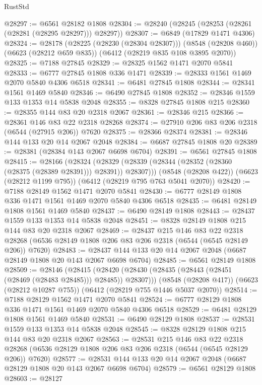 \begin{lexlean}{RustStd}
\begin{coremodule}
@28297 := @6561 @28182 @1808
@28304 := @28240 (@28245 (@28253 (@28261 (@28281 (@28295 @28297))) @28297))
@28307 := @6849 (@17829 @1471 @4306)
@28324 := @28178
    (@28225 (@28230 (@28304 @28307)))
    (@8548 (@28208 @460))
    (@6623 (@28212 @659 @835))
    (@6412 (@28219 @835 @108 @3895 @2070))
@28325 := @7188 @27845
@28329 := @28325 @1562 @1471 @2070 @5841
@28333 := @6777 @27845 @1808 @336 @1471
@28339 := @28333 @1561 @1469 @2070 @5840 @4306 @6518
@28341 := @6481 @27845 @1808
@28344 := @28341 @1561 @1469 @5840
@28346 := @6490 @27845 @1808
@28352 := @28346 @1559 @133 @1353 @14 @5838 @2048
@28355 := @8328 @27845 @1808 @215
@28360 := @28355 @144 @83 @20 @2318 @2067
@28361 := @28346 @215
@28366 := @28361 @146 @83 @22 @2318 @28268
@28374 := @27910 @206 @83 @206 @2318 (@6544 (@27915 @206)) @7620
@28375 := @28366 @28374
@28381 := @28346 @144 @133 @20 @14 @2067 @2048
@28384 := @6687 @27845 @1808 @20
@28389 := @28381 (@28384 @143 @2067 @6698 @6704)
@28391 := @6561 @27845 @1808
@28415 := @28166
    (@28324 (@28329 (@28339 (@28344 (@28352 (@28360 (@28375 (@28389 @28391))) @28391)) @28307)))
    (@8548 (@28208 @422))
    (@6623 (@28212 @1199 @795))
    (@6412 (@28219 @795 @763 @5041 @2070))
@28420 := @7188 @28149 @1562 @1471 @2070 @5841
@28430 := @6777 @28149 @1808 @336 @1471 @1561 @1469 @2070 @5840 @4306 @6518
@28435 := @6481 @28149 @1808 @1561 @1469 @5840
@28437 := @6490 @28149 @1808
@28443 := @28437 @1559 @133 @1353 @14 @5838 @2048
@28451 := @8328 @28149 @1808 @215 @144 @83 @20 @2318 @2067
@28469 := @28437
    @215
    @146
    @83
    @22
    @2318
    @28268
    (@6536 @28149 @1808 @206 @83 @206 @2318 (@6544 (@6545 @28149 @206)) @7620)
@28483 := @28437 @144 @133 @20 @14 @2067 @2048 (@6687 @28149 @1808 @20 @143 @2067 @6698 @6704)
@28485 := @6561 @28149 @1808
@28509 := @28146
    (@28415 (@28420 (@28430 (@28435 (@28443 (@28451 (@28469 (@28483 @28485))) @28485)) @28307)))
    (@8548 (@28208 @417))
    (@6623 (@28212 @10287 @755))
    (@6412 (@28219 @755 @1446 @5037 @2070))
@28514 := @7188 @28129 @1562 @1471 @2070 @5841
@28524 := @6777 @28129 @1808 @336 @1471 @1561 @1469 @2070 @5840 @4306 @6518
@28529 := @6481 @28129 @1808 @1561 @1469 @5840
@28531 := @6490 @28129 @1808
@28537 := @28531 @1559 @133 @1353 @14 @5838 @2048
@28545 := @8328 @28129 @1808 @215 @144 @83 @20 @2318 @2067
@28563 := @28531
    @215
    @146
    @83
    @22
    @2318
    @28268
    (@6536 @28129 @1808 @206 @83 @206 @2318 (@6544 (@6545 @28129 @206)) @7620)
@28577 := @28531 @144 @133 @20 @14 @2067 @2048 (@6687 @28129 @1808 @20 @143 @2067 @6698 @6704)
@28579 := @6561 @28129 @1808
@28603 := @28127

\end{coremodule}
\end{lexlean}
